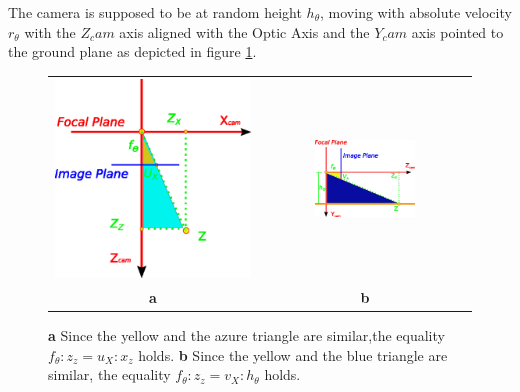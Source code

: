 The camera is supposed to be at random height $h_{\theta}$,  moving with absolute velocity $r_{\theta}$ with the $Z_cam$ axis aligned with the Optic Axis and the $Y_cam$ axis pointed to the ground plane as depicted in figure \ref{fig: UV}.
\begin{figure} \label{fig: UV}
\begin{tabular}{cc} 
\includegraphics[width=0.5 \textwidth]{ImaginiLatex/Ux.eps} &
\includegraphics[width=0.5\textwidth]{ImaginiLatex/Vx.eps} \\
\textbf{a} & \textbf{b}
\end{tabular}
\caption{\textbf{a} Since the yellow and the azure triangle are similar,the equality $f_{\theta}:z_z = u_X:x_z$ holds. \textbf{b} Since the yellow and the blue triangle are similar, the equality $f_{\theta}:z_z = v_X:h_{\theta}$ holds. }
\end{figure}

